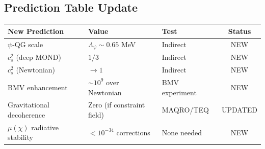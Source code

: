 \documentclass[11pt,a4paper]{article}
\begin{document}
\subsection{Prediction Table Update}

\begin{center}
\begin{tabular}{lllc}
\toprule
\textbf{New Prediction} & \textbf{Value} & \textbf{Test} & \textbf{Status} \\
\midrule
$\psi$-QG scale & $\Lambda_\psi \sim 0.65$ MeV & Indirect & NEW \\
$c_s^2$ (deep MOND) & $1/3$ & Indirect & NEW \\
$c_s^2$ (Newtonian) & $\to 1$ & Indirect & NEW \\
BMV enhancement & $\sim 10^9$ over Newtonian & BMV experiment & NEW \\
Gravitational decoherence & Zero (if constraint field) & MAQRO/TEQ & UPDATED \\
$\mu(\chi)$ radiative stability & $<10^{-34}$ corrections & None needed & NEW \\
\bottomrule
\end{tabular}
\end{center}
\end{document}
